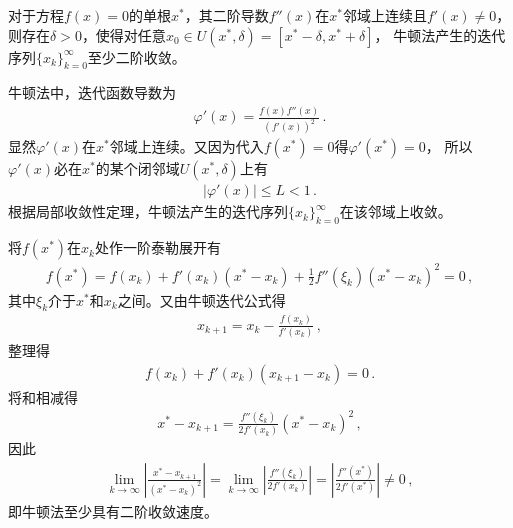 \begin{theorem}
    对于方程$f(x)=0$的单根$x^*$，其二阶导数$f''(x)$在$x^*$邻域上连续且$f'(x)\neq0$，
    则存在$\delta>0$，使得对任意$x_0\in U(x^*,\delta)=[x^*-\delta,x^*+\delta]$，
    牛顿法产生的迭代序列$\{x_k\}_{k=0}^\infty$至少二阶收敛。
\end{theorem}
\begin{prove}
    牛顿法中，迭代函数导数为
    \begin{align}\label{eq:02ex0326}
        \varphi'(x)=\frac{f(x)f''(x)}{(f'(x))^2}\, .
    \end{align}
    显然$\varphi'(x)$在$x^*$邻域上连续。又因为代入$f(x^*)=0$得$\varphi'(x^*)=0$，
    所以$\varphi'(x)$必在$x^*$的某个闭邻域$U(x^*,\delta)$上有
    \begin{align}\label{eq:02ex0327}
        |\varphi'(x)|\le L<1\, .
    \end{align}
    根据局部收敛性定理，牛顿法产生的迭代序列$\{x_k\}_{k=0}^\infty$在该邻域上收敛。

    将$f(x^*)$在$x_k$处作一阶泰勒展开有
    \begin{align}\label{eq:02ex0328}
        f(x^*)=f(x_k)+f'(x_k)(x^*-x_k)+\frac{1}{2}f''(\xi_k)(x^*-x_k)^2=0\, ,
    \end{align}
    其中$\xi_k$介于$x^*$和$x_k$之间。又由牛顿迭代公式得
    \begin{align}\label{eq:02ex0329}
        x_{k+1}=x_k-\frac{f(x_k)}{f'(x_k)}\, ,
    \end{align}
    整理得
    \begin{align}\label{eq:02ex0330}
        f(x_k)+f'(x_k)(x_{k+1}-x_k)=0\, .
    \end{align}
    将和相减得
    \begin{align}\label{eq:02ex0331}
        x^*-x_{k+1}=\frac{f''(\xi_k)}{2f'(x_k)}(x^*-x_k)^2\, ,
    \end{align}
    因此
    \begin{align}\label{eq:02ex0332}
        \lim\limits_{k\rightarrow\infty}{\left|\frac{x^*-x_{k+1}}{(x^*-x_k)^2}\right|}=\lim\limits_{k\rightarrow\infty}{\left|\frac{f''(\xi_k)}{2f'(x_k)}\right|}=\left|\frac{f''(x^*)}{2f'(x^*)}\right|\neq0\, ,
    \end{align}
    即牛顿法至少具有二阶收敛速度。
\end{prove}